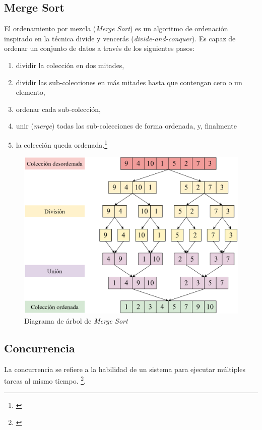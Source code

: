 \documentclass[titlepage]{article}
\begin{document}
\subsection{Merge Sort}
El ordenamiento por mezcla (\textit{Merge Sort}) es un algoritmo de ordenación inspirado en la técnica divide y vencerás (\textit{divide-and-conquer}). Es capaz de ordenar un conjunto de datos a través de los siguientes pasos: 
\begin{spacing}{1}
\begin{enumerate}
    \item dividir la colección en dos mitades,
    \item dividir las sub-colecciones en más mitades hasta que contengan cero o un elemento,
    \item ordenar cada sub-colección,
    \item unir (\textit{merge}) todas las sub-colecciones de forma ordenada, y, finalmente
    \item la colección queda ordenada.\footnote{\cite{skiena-2008}}
\end{enumerate}
\end{spacing}

\begin{figure}
    \centering
    \includegraphics[width=0.75\linewidth]{Diagrames/arbolMS.png}
    \caption{Diagrama de árbol de \textit{Merge Sort}}
    \label{fig:arbolMS}
\end{figure}


\subsection{Concurrencia}
La concurrencia se refiere a la habilidad de un sistema para ejecutar múltiples tareas al mismo tiempo. \footnote{\cite{magee-2006}}.
\end{document}
